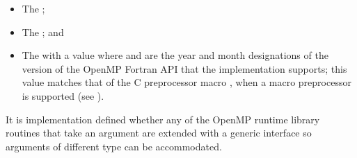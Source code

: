 \begin{fortranspecific}
\begin{itemize}
\item The   ;
\item The   ; and
\item The    with a value 
       where  and  are the year and month designations 
      of the version of the OpenMP Fortran API that the implementation supports; 
      this value matches that of the C preprocessor macro , when a 
      macro preprocessor is supported (see ).
\end{itemize}

It is implementation defined whether any of the OpenMP runtime library 
routines that take an argument are extended with a generic interface so 
arguments of different  type can be accommodated. 
\end{fortranspecific}







